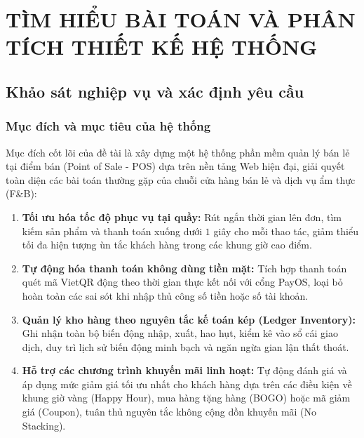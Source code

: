\chapter{TÌM HIỂU BÀI TOÁN VÀ PHÂN TÍCH THIẾT KẾ HỆ THỐNG}
\label{chap:phan_tich_thiet_ke}

\section{Khảo sát nghiệp vụ và xác định yêu cầu}
\label{sec:khao_sat_nghiep_vu}

\subsection{Mục đích và mục tiêu của hệ thống}
Mục đích cốt lõi của đề tài là xây dựng một hệ thống phần mềm quản lý bán lẻ tại điểm bán (Point of Sale - POS) dựa trên nền tảng Web hiện đại, giải quyết toàn diện các bài toán thường gặp của chuỗi cửa hàng bán lẻ và dịch vụ ẩm thực (F\&B):
\begin{enumerate}[label=\arabic*., leftmargin=1.5cm]
    \item \textbf{Tối ưu hóa tốc độ phục vụ tại quầy:} Rút ngắn thời gian lên đơn, tìm kiếm sản phẩm và thanh toán xuống dưới $1$ giây cho mỗi thao tác, giảm thiểu tối đa hiện tượng ùn tắc khách hàng trong các khung giờ cao điểm.
    \item \textbf{Tự động hóa thanh toán không dùng tiền mặt:} Tích hợp thanh toán quét mã VietQR động theo thời gian thực kết nối với cổng PayOS, loại bỏ hoàn toàn các sai sót khi nhập thủ công số tiền hoặc số tài khoản.
    \item \textbf{Quản lý kho hàng theo nguyên tắc kế toán kép (Ledger Inventory):} Ghi nhận toàn bộ biến động nhập, xuất, hao hụt, kiểm kê vào sổ cái giao dịch, duy trì lịch sử biến động minh bạch và ngăn ngừa gian lận thất thoát.
    \item \textbf{Hỗ trợ các chương trình khuyến mãi linh hoạt:} Tự động đánh giá và áp dụng mức giảm giá tối ưu nhất cho khách hàng dựa trên các điều kiện về khung giờ vàng (Happy Hour), mua hàng tặng hàng (BOGO) hoặc mã giảm giá (Coupon), tuân thủ nguyên tắc không cộng dồn khuyến mãi (No Stacking).
\end{enumerate}

